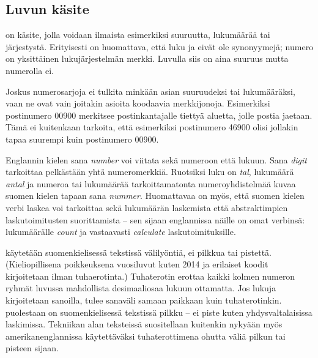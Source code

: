 \subsection{Luvun käsite}

 on käsite, jolla voidaan ilmaista esimerkiksi suuruutta, lukumäärää tai järjestystä. Erityisesti on huomattava, että luku ja  eivät ole synonyymejä; numero on yksittäinen lukujärjestelmän merkki. Luvulla siis on aina suuruus mutta numerolla ei.

\begin{esimerkki}
\end{esimerkki}

Joskus numerosarjoja ei tulkita minkään asian suuruudeksi tai lukumääräksi, vaan ne ovat vain joitakin asioita koodaavia merkkijonoja. Esimerkiksi postinumero 00900 merkitsee postinkantajalle tiettyä aluetta, jolle postia jaetaan. Tämä ei kuitenkaan tarkoita, että esimerkiksi postinumero 46900 olisi jollakin tapaa suurempi kuin postinumero 00900.


Englannin kielen sana \textit{number} voi viitata sekä numeroon että lukuun. Sana \textit{digit} tarkoittaa pelkästään yhtä numeromerkkiä. Ruotsiksi luku on \textit{tal}, lukumäärä \textit{antal} ja numeroa tai lukumäärää tarkoittamatonta numeroyhdistelmää kuvaa suomen kielen tapaan sana \textit{nummer}. Huomattavaa on myös, että suomen kielen verbi laskea voi tarkoittaa sekä lukumäärän laskemista että abstraktimpien laskutoimitusten suorittamista -- sen sijaan englannissa näille on omat verbinsä: lukumäärälle \textit{count} ja vastaavasti \textit{calculate} laskutoimituksille.

 käytetään suomenkielisessä tekstissä välilyöntiä, ei pilkkua tai pistettä. (Kieliopillisena poikkeuksena vuosiluvut kuten 2014 ja erilaiset koodit kirjoitetaan ilman tuhaerotinta.) Tuhaterotin erottaa kaikki kolmen numeron ryhmät luvussa mahdollista desimaaliosaa lukuun ottamatta. Jos lukuja kirjoitetaan sanoilla, tulee sanaväli samaan paikkaan kuin tuhaterotinkin.  puolestaan on suomenkielisessä tekstissä pilkku -- ei piste kuten yhdysvaltalaisissa laskimissa. Tekniikan alan teksteissä suositellaan kuitenkin nykyään myös amerikanenglannissa käytettäväksi tuhaterottimena ohutta väliä pilkun tai pisteen sijaan. %

